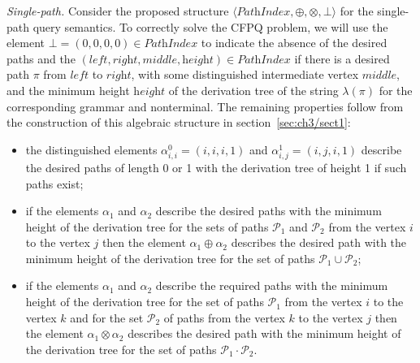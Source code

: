 \textit{Single-path.} %
Consider the proposed structure $\langle \textit{PathIndex}, \oplus, \otimes, \bot \rangle$ for the single-path query semantics. To correctly solve the CFPQ problem, we will use the element $\bot = (0, 0, 0, 0) \in \textit{PathIndex}$ to indicate the absence of the desired paths and the $(\textit{left}, \textit{right}, \textit{middle}, \textit{height}) \in \textit{PathIndex}$ if there is a desired path $\pi$ from $\textit{left}$ to $\textit{right}$, with some distinguished intermediate vertex $\textit{middle}$, and the minimum height $\textit{height}$ of the derivation tree of the string $\lambda(\pi)$ for the corresponding grammar and nonterminal. The remaining properties follow from the construction of this algebraic structure in section~\ref{sec:ch3/sect1}:
\begin{itemize}
        \item the distinguished elements $\alpha^0_{i, i} = (i, i, i, 1)$ and $\alpha^1_{i, j} = (i, j, i, 1)$ describe the desired paths of length 0 or 1 with the derivation tree of height 1 if such paths exist;
	    \item if the elements $\alpha_1$ and $\alpha_2$ describe the desired paths with the minimum height of the derivation tree for the sets of paths $\mathcal{P}_1$ and $\mathcal{P}_2$ from the vertex $i$ to the vertex $j$ then the element $\alpha_1 \oplus \alpha_2$ describes the desired path with the minimum height of the derivation tree for the set of paths $\mathcal{P}_1 \cup \mathcal{P}_2$;
	    \item if the elements $\alpha_1$ and $\alpha_2$ describe the required paths with the minimum height of the derivation tree for the set of paths $\mathcal{P}_1$ from the vertex $i$ to the vertex $k$ and for the set $\mathcal{P}_2$ of paths from the vertex $k$ to the vertex $j$ then the element $\alpha_1 \otimes \alpha_2$ describes the desired path with the minimum height of the derivation tree for the set of paths $\mathcal{P}_1 \cdot \mathcal{P}_2$.
	\end{itemize}

